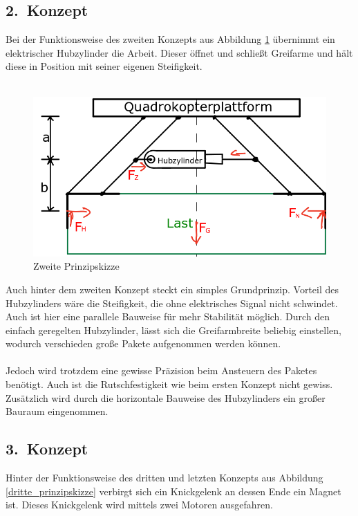 \subsection{2.~Konzept}
Bei der Funktionsweise des zweiten Konzepts aus Abbildung \ref{zweite_prinzipskizze} übernimmt ein elektrischer Hubzylinder die Arbeit. Dieser öffnet und schließt Greifarme und hält diese in Position mit seiner eigenen Steifigkeit.
\\
\\
\begin{figure}[h]
	\begin{center}
	\includegraphics[scale=0.7]{"Grafiken/Skizze2mechanik.png"}
	\caption{Zweite Prinzipskizze}
	\label{zweite_prinzipskizze}
	\end{center}
\end{figure}
\newpage
Auch hinter dem zweiten Konzept steckt ein simples Grundprinzip. Vorteil des Hubzylinders wäre die Steifigkeit, die ohne elektrisches Signal nicht schwindet. Auch ist hier eine parallele Bauweise für mehr Stabilität möglich. Durch den einfach geregelten Hubzylinder, lässt sich die Greifarmbreite beliebig einstellen, wodurch verschieden große Pakete aufgenommen werden können.\\
\\
Jedoch wird trotzdem eine gewisse Präzision beim Ansteuern des Paketes benötigt. Auch ist die Rutschfestigkeit wie beim ersten Konzept nicht gewiss. Zusätzlich wird durch die horizontale Bauweise des Hubzylinders ein großer Bauraum eingenommen.
 
\subsection{3.~Konzept}
Hinter der Funktionsweise des dritten und letzten Konzepts aus Abbildung \ref{dritte_prinzipskizze} verbirgt sich ein Knickgelenk an dessen Ende ein Magnet ist. Dieses Knickgelenk wird mittels zwei Motoren ausgefahren.

